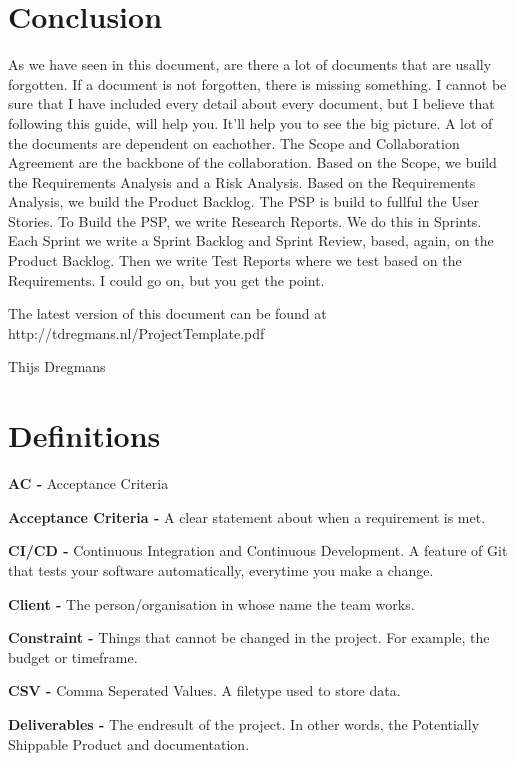 \documentclass[10pt]{report}
\begin{document}
\chapter{Conclusion}
\thispagestyle{fancy}

As we have seen in this document, are there a lot of documents that are usally forgotten. If a document is not forgotten, there is missing something. I cannot be sure that I have included every detail about every document, but I believe that following this guide, will help you. It'll help you to see the big picture. A lot of the documents are dependent on eachother. The Scope and Collaboration Agreement are the backbone of the collaboration. Based on the Scope, we build the Requirements Analysis and a Risk Analysis. Based on the Requirements Analysis, we build the Product Backlog. The PSP is build to fullful the User Stories. To Build the PSP, we write Research Reports. We do this in Sprints. Each Sprint we write a Sprint Backlog and Sprint Review, based, again, on the Product Backlog. Then we write Test Reports where we test based on the Requirements. I could go on, but you get the point.

The latest version of this document can be found at http://tdregmans.nl/ProjectTemplate.pdf

\bigskip

Thijs Dregmans


\chapter{Definitions}
\thispagestyle{fancy}

\textbf{AC -} Acceptance Criteria

\textbf{Acceptance Criteria -} A clear statement about when a requirement is met. 

\textbf{CI/CD -} Continuous Integration and Continuous Development. A feature of Git that tests your software automatically, everytime you make a change.

\textbf{Client -} The person/organisation in whose name the team works.

\textbf{Constraint -} Things that cannot be changed in the project. For example, the budget or timeframe.

\textbf{CSV -} Comma Seperated Values. A filetype used to store data.

\textbf{Deliverables -} The endresult of the project. In other words, the Potentially Shippable Product and documentation.
\end{document}
